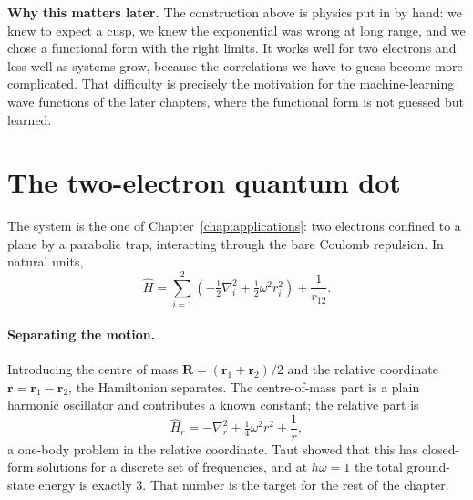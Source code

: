 \begin{notebox}
\textbf{Why this matters later.} The construction above is physics put in by
hand: we knew to expect a cusp, we knew the exponential was wrong at long
range, and we chose a functional form with the right limits.  It works well
for two electrons and less well as systems grow, because the correlations we
have to guess become more complicated.  That difficulty is precisely the
motivation for the machine-learning wave functions of the later chapters,
where the functional form is not guessed but learned.
\end{notebox}

\section{The two-electron quantum dot}
\label{sec:vmcdot}

The system is the one of Chapter~\ref{chap:applications}: two electrons
confined to a plane by a parabolic trap, interacting through the bare Coulomb
repulsion.  In natural units,
\begin{equation}
  \hat{H} = \sum_{i=1}^{2}
    \left(-\tfrac12\nabla_i^2 + \tfrac12\omega^2 r_i^2\right)
    + \frac{1}{r_{12}} .
  \label{eq:13-hamiltonian}
\end{equation}

\paragraph{Separating the motion.}
Introducing the centre of mass $\bm{R}=(\bm{r}_1+\bm{r}_2)/2$ and the relative
coordinate $\bm{r}=\bm{r}_1-\bm{r}_2$, the Hamiltonian separates.  The
centre-of-mass part is a plain harmonic oscillator and contributes a known
constant; the relative part is
\begin{equation}
  \hat{H}_r = -\nabla_r^2 + \tfrac14\omega^2 r^2 + \frac{1}{r},
  \label{eq:13-relative}
\end{equation}
a one-body problem in the relative coordinate.  Taut showed that this has
closed-form solutions for a discrete set of frequencies, and at
$\hbar\omega=1$ the total ground-state energy is exactly $3$.  That number is
the target for the rest of the chapter.

